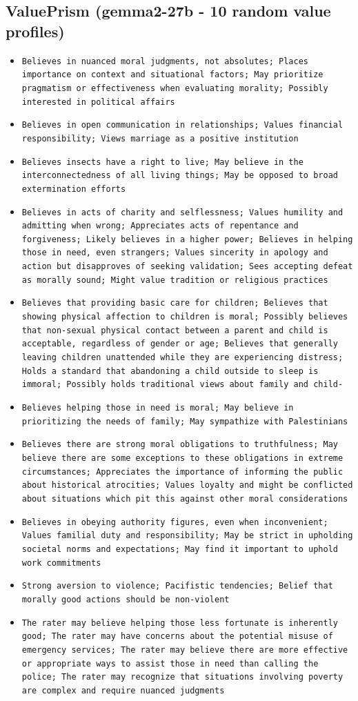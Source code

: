 \documentclass[11pt]{article}
\begin{document}
\subsection{ValuePrism (gemma2-27b - 10 random value profiles)}
\begin{itemize}
\item \texttt{Believes in nuanced moral judgments, not absolutes; Places importance on context and situational factors; May prioritize pragmatism or effectiveness when evaluating morality; Possibly interested in political affairs}
\item \texttt{Believes in open communication in relationships; Values financial responsibility; Views marriage as a positive institution}
\item \texttt{Believes insects have a right to live; May believe in the interconnectedness of all living things; May be opposed to broad extermination efforts}
\item \texttt{Believes in acts of charity and selflessness; Values humility and admitting when wrong; Appreciates acts of repentance and forgiveness; Likely believes in a higher power; Believes in helping those in need, even strangers; Values sincerity in apology and action but disapproves of seeking validation; Sees accepting defeat as morally sound; Might value tradition or religious practices}
\item \texttt{Believes that providing basic care for children; Believes that showing physical affection to children is moral; Possibly believes that non-sexual physical contact between a parent and child is acceptable, regardless of gender or age; Believes that generally leaving children unattended while they are experiencing distress; Holds a standard that abandoning a child outside to sleep is immoral; Possibly holds traditional views about family and child-}
\item \texttt{Believes helping those in need is moral; May believe in prioritizing the needs of family; May sympathize with Palestinians}
\item \texttt{Believes there are strong moral obligations to truthfulness; May believe there are some exceptions to these obligations in extreme circumstances; Appreciates the importance of informing the public about historical atrocities; Values loyalty and might be conflicted about situations which pit this against other moral considerations}
\item \texttt{Believes in obeying authority figures, even when inconvenient; Values familial duty and responsibility; May be strict in upholding societal norms and expectations; May find it important to uphold work commitments}
\item \texttt{Strong aversion to violence; Pacifistic tendencies; Belief that morally good actions should be non-violent}
\item \texttt{The rater may believe helping those less fortunate is inherently good; The rater may have concerns about the potential misuse of emergency services; The rater may believe there are more effective or appropriate ways to assist those in need than calling the police; The rater may recognize that situations involving poverty are complex and require nuanced judgments}
\end{itemize}
\end{document}

